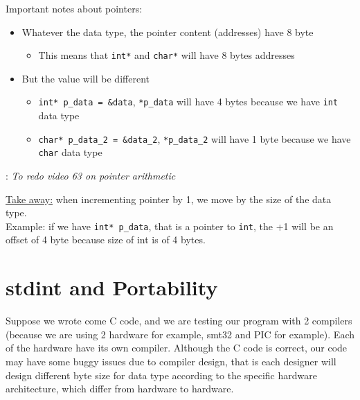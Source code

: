 Important notes about pointers:

\begin{itemize}
    \item Whatever the data type, the pointer content (addresses) have 8 byte
    
    \begin{itemize}
        \item This means that \verb|int*| and \verb|char*| will have 8 bytes addresses
    \end{itemize}
    
    \item But the value will be different
    
    \begin{itemize}
        \item \verb|int* p_data = &data|, \verb|*p_data| will have 4 bytes because we have \verb|int| data type
        
        \item \verb|char* p_data_2 = &data_2|, \verb|*p_data_2| will have 1 byte because we have \verb|char| data type
    \end{itemize}
    
    
\end{itemize}

: \textit{To redo video 63 on pointer arithmetic}

\underline{Take away:} when incrementing pointer by 1, we move by the size of the data type.\\

Example: if we have \verb|int* p_data|, that is a pointer to \verb|int|, the +1 will be an offset of 4 byte because size of int is of 4 bytes.

\newpage

\section{stdint and Portability}

Suppose we wrote come C code, and we are testing our program with 2 compilers (because we are using 2 hardware for example, smt32 and PIC for example). Each of the hardware have its own compiler. Although the C code is correct, our code may have some buggy issues due to compiler design, that is each designer will design different byte size for data type according to the specific hardware architecture, which differ from hardware to hardware.\\

